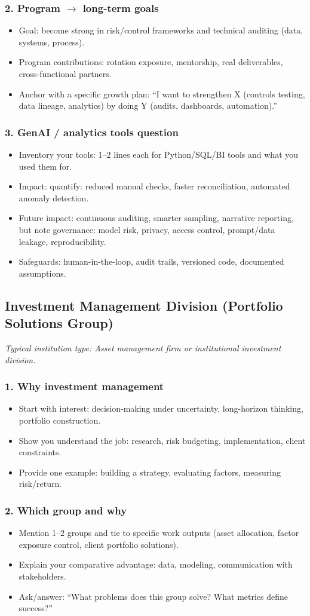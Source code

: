 \documentclass[11pt,letterpaper,openany]{book}
\newcommand{\RoleProfile}[2]{%
  \subsection{#1}%
  \noindent\textit{Typical institution type: #2.}\par
}
\newcommand{\prompt}[1]{\subsubsection*{#1}}
\begin{document}
\prompt{2. Program $\to$ long-term goals}
\begin{itemize}
  \item Goal: become strong in risk/control frameworks and technical auditing (data, systems, process).
  \item Program contributions: rotation exposure, mentorship, real deliverables, cross-functional partners.
  \item Anchor with a specific growth plan: ``I want to strengthen X (controls testing, data lineage, analytics) by doing Y (audits, dashboards, automation).''
\end{itemize}

\prompt{3. GenAI / analytics tools question}
\begin{itemize}
  \item Inventory your tools: 1--2 lines each for Python/SQL/BI tools and what you used them for.
  \item Impact: quantify: reduced manual checks, faster reconciliation, automated anomaly detection.
  \item Future impact: continuous auditing, smarter sampling, narrative reporting, but note governance: model risk, privacy, access control, prompt/data leakage, reproducibility.
  \item Safeguards: human-in-the-loop, audit trails, versioned code, documented assumptions.
\end{itemize}

\RoleProfile{Investment Management Division (Portfolio Solutions Group)}{Asset management firm or institutional investment division}

\prompt{1. Why investment management}
\begin{itemize}
  \item Start with interest: decision-making under uncertainty, long-horizon thinking, portfolio construction.
  \item Show you understand the job: research, risk budgeting, implementation, client constraints.
  \item Provide one example: building a strategy, evaluating factors, measuring risk/return.
\end{itemize}

\prompt{2. Which group and why}
\begin{itemize}
  \item Mention 1--2 groups and tie to specific work outputs (asset allocation, factor exposure control, client portfolio solutions).
  \item Explain your comparative advantage: data, modeling, communication with stakeholders.
  \item Ask/answer: ``What problems does this group solve? What metrics define success?''
\end{itemize}
\end{document}

